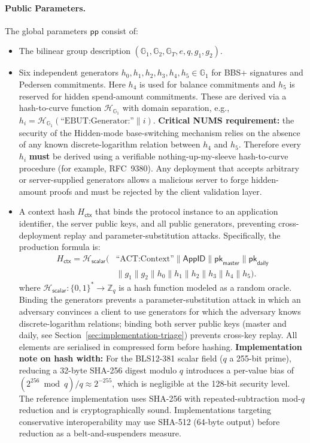 \documentclass[11pt]{article}
\theoremstyle{definitionstyle}
\theoremstyle{plain}
\begin{document}
\paragraph{Public Parameters.}
The global parameters $\mathsf{pp}$ consist of:
\begin{itemize}
\item The bilinear group description $(\mathbb{G}_1,\mathbb{G}_2,\mathbb{G}_T,e,q,g_1,g_2)$.
\item Six independent generators $h_0, h_1, h_2, h_3, h_4, h_5 \in \mathbb{G}_1$ for BBS+ signatures and Pedersen commitments. Here $h_4$ is used for balance commitments and $h_5$ is reserved for hidden spend-amount commitments. These are derived via a hash-to-curve function $\mathcal{H}_{\mathbb{G}_1}$ with domain separation, e.g., $h_i = \mathcal{H}_{\mathbb{G}_1}(\text{``EBUT:Generator:''} \parallel i)$. \textbf{Critical NUMS requirement:} the security of the Hidden-mode base-switching mechanism relies on the absence of any known discrete-logarithm relation between $h_4$ and $h_5$. Therefore every $h_i$ \textbf{must} be derived using a verifiable nothing-up-my-sleeve hash-to-curve procedure (for example, RFC~9380). Any deployment that accepts arbitrary or server-supplied generators allows a malicious server to forge hidden-amount proofs and must be rejected by the client validation layer.
\item A context hash $H_{\mathsf{ctx}}$ that binds the protocol instance to an application identifier, the server public keys, and all public generators, preventing cross-deployment replay and parameter-substitution attacks. Specifically, the production formula is:
  \[
  \begin{aligned}
  H_{\mathsf{ctx}} = \mathcal{H}_{\mathsf{scalar}}\!\bigl(
    &\text{``ACT:Context''} \parallel \mathsf{AppID}
    \parallel \mathsf{pk}_{\mathsf{master}} \parallel \mathsf{pk}_{\mathsf{daily}} \\
    &\parallel g_1 \parallel g_2
    \parallel h_0 \parallel h_1 \parallel h_2 \parallel h_3 \parallel h_4 \parallel h_5
  \bigr).
  \end{aligned}
  \]
  where $\mathcal{H}_{\mathsf{scalar}}: \{0,1\}^* \to \mathbb{Z}_q$ is a hash function modeled as a random oracle. Binding the generators prevents a parameter-substitution attack in which an adversary convinces a client to use generators for which the adversary knows discrete-logarithm relations; binding both server public keys (master and daily, see Section~\ref{sec:implementation-triage}) prevents cross-key replay. All elements are serialised in compressed form before hashing. \textbf{Implementation note on hash width:} For the BLS12-381 scalar field ($q$ a 255-bit prime), reducing a 32-byte SHA-256 digest modulo $q$ introduces a per-value bias of $(2^{256} \bmod q)/q \approx 2^{-255}$, which is negligible at the 128-bit security level. The reference implementation uses SHA-256 with repeated-subtraction mod-$q$ reduction and is cryptographically sound. Implementations targeting conservative interoperability may use SHA-512 (64-byte output) before reduction as a belt-and-suspenders measure.
\end{itemize}
\end{document}
